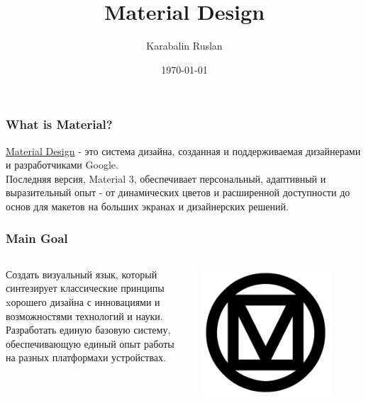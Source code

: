 \documentclass[12pt]{beamer}
\title{Material Design}
\author{Karabalin Ruslan}
\date{\today}
\begin{document}
	
	\begin{frame}

		\titlepage

	\end{frame}
	
	\begin{frame}
		\frametitle{What is Material?}
		
		\href{https://m3.material.io/}{Material Design} - это система дизайна,
        созданная и поддерживаемая дизайнерами и разработчиками Google. \\
		
		Последняя версия, Material 3,
        обеспечивает персональный, адаптивный
        и выразительный опыт - от динамических цветов
        и расширенной доступности до основ
        для макетов на больших экранах и дизайнерских решений.
		
	\end{frame}
	
	\begin{frame}
		\frametitle{Main Goal}

        \begin{columns}
            \begin{column}{0.5\textwidth}
                Создать визуальный язык,
                который синтезирует классические принципы
                xорошего дизайна с инновациями
                и возможностями технологий и науки. \\

                Разработать единую базовую систему,
                обеспечивающую единый опыт работы
                на разных платформахи устройствах.
            \end{column}
            
            \begin{column}{0.5\textwidth}
                \includegraphics[width=0.8\textwidth]{md.png}
            \end{column}

        \end{columns}

	\end{frame}
\end{document}
